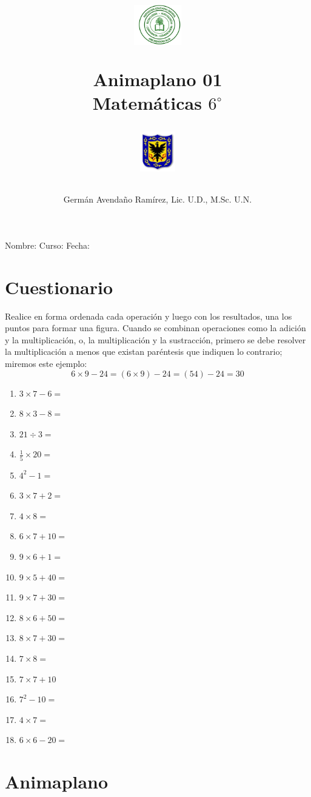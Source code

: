 \documentclass[10pt,twoside]{article}
\author{Germ\'an Avenda\~no Ram\'irez, Lic. U.D., M.Sc. U.N.}
\title{\begin{minipage}{.2\textwidth}
\includegraphics[height=1.75cm]{Images/logo-colegio.png}\end{minipage}
\begin{minipage}{.55\textwidth}
\begin{center}
Animaplano 01 \\
Matemáticas $6^{\circ}$
\end{center}
\end{minipage}\hfill
\begin{minipage}{.2\textwidth}
\includegraphics[height=1.75cm]{Images/logo-sed.png} 
\end{minipage}}
\date{}
\begin{document}
\maketitle
Nombre: \hrulefill Curso: \underline{\hspace*{44pt}} Fecha: \underline{\hspace*{2.5cm}}
\section*{Cuestionario}
Realice en forma ordenada cada operación y luego con los resultados, una los puntos para formar una figura. Cuando se combinan operaciones como la adición y la multiplicación, o, la multiplicación y la sustracción, primero se debe resolver la multiplicación a menos que existan paréntesis que indiquen lo contrario; miremos este ejemplo:
\[6\times 9-24=(6\times 9)-24=(54)-24=30\]
\begin{enumerate}
\item $3\times 7-6=$
\item $8\times 3-8=$
\item $21\div 3=$
\item $\frac{1}{5}\times 20=$
\item $4^{2}-1=$
\item $3\times 7+2=$
\item $4\times 8=$
\item $6\times 7+10=$
\item $9\times 6+1=$
\item $9\times 5 +40=$
\item $9\times 7+30=$
\item $8\times 6+50=$
\item $8\times 7+30=$
\item $7\times 8=$
\item $7\times 7+10$
\item $7^{2}-10=$
\item $4\times 7=$
\item $6\times 6-20=$
\end{enumerate}
\section*{Animaplano}
\end{document}
